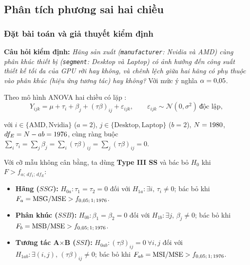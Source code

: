 %
%   

\subsection{Phân tích phương sai hai chiều}
\label{sec:anova_two_way}

\subsubsection{Đặt bài toán và giả thuyết kiểm định}

\textbf{Câu hỏi kiểm định:} \emph{Hãng sản xuất (\texttt{manufacturer}: Nvidia và AMD)
cùng phân khúc thiết bị (\texttt{segment}: Desktop và Laptop) có ảnh hưởng đến công suất
thiết kế tối đa của GPU rời hay không, và chênh lệch giữa hai hãng có phụ thuộc vào phân
khúc (hiệu ứng tương tác) hay không?} Với  mức ý nghĩa $\alpha = 0{,}05$.

Theo mô hình ANOVA hai chiều có lặp :
\begin{equation}
  Y_{ijk} = \mu + \tau_i + \beta_j + (\tau\beta)_{ij} + \varepsilon_{ijk},
  \qquad \varepsilon_{ijk} \sim \mathcal{N}(0, \sigma^2)\ \text{độc lập},
  \label{eq:two_way_anova}
\end{equation}
{\sloppy với $i \in \{\text{AMD}, \text{Nvidia}\}$ ($a=2$), $j \in \{\text{Desktop},
\text{Laptop}\}$ ($b=2$), $N = 1980$, $df_E = N - ab = 1976$, cùng ràng buộc
$\sum_i \tau_i = \sum_j \beta_j = \sum_i (\tau\beta)_{ij} = \sum_j (\tau\beta)_{ij} = 0$.

Với cỡ mẫu không cân bằng, ta dùng \textbf{Type III SS} và bác bỏ $H_0$ khi $F >
f_{\alpha;\, df_1;\, df_E}$:\par}
\begin{itemize}\setlength{\itemsep}{1pt}\setlength{\parskip}{0pt}
  \item \textbf{Hãng ($SSG$):} $H_{0a}: \tau_1 = \tau_2 = 0$ đối với $H_{1a}: \exists i,\,
    \tau_i \neq 0$; bác bỏ khi $F_a = \mathrm{MSG}/\mathrm{MSE} >
    f_{0{,}05;\, 1;\, 1976}$.
  \item \textbf{Phân khúc ($SSB$):} $H_{0b}: \beta_1 = \beta_2 = 0$ đối với $H_{1b}:
    \exists j,\, \beta_j \neq 0$; bác bỏ khi $F_b = \mathrm{MSB}/\mathrm{MSE} >
    f_{0{,}05;\, 1;\, 1976}$.
  \item \textbf{Tương tác A$\times$B ($SSI$):} $H_{0ab}: (\tau\beta)_{ij} = 0\ \forall i,j$
    đối với $H_{1ab}: \exists (i,j),\, (\tau\beta)_{ij} \neq 0$; bác bỏ khi $F_{ab} =
    \mathrm{MSI}/\mathrm{MSE} > f_{0{,}05;\, 1;\, 1976}$.
\end{itemize}

